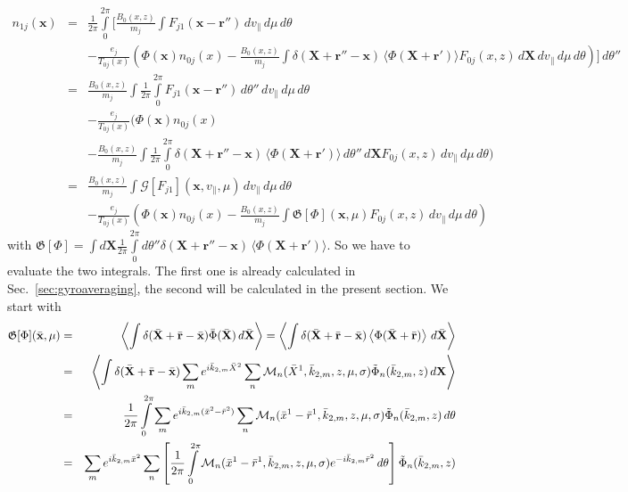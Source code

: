 \begin{eqnarray*}
  n_{1j}(\mathbf{x}) &=&\frac{1}{2\pi}\int\limits_0^{2\pi}
  \Bigg[
    \frac{B_0(x,z)}{m_j}\int F_{j1}(\mathbf{x}-\mathbf{r}'')\,dv_\|\,d\mu\,d\theta\\
    &&-\frac{e_j}{T_{0j}(x)}\left(
      \Phi(\mathbf{x}) n_{0j}(x)
      -\frac{B_0(x,z)}{m_j}\int\delta(\mathbf{X}+\mathbf{r}''-\mathbf{x})\,\langle\Phi(\mathbf{X}+\mathbf{r}')\rangle
      F_{0j}(x,z)\,d\mathbf{X}\,dv_\|\,d\mu\,d\theta
    \right) 
  \Bigg]\,d\theta''\\
  &=& 
  \frac{B_0(x,z)}{m_j}\int \frac{1}{2\pi}\int\limits_0^{2\pi} F_{j1}(\mathbf{x}-\mathbf{r}'')\,d\theta''\,dv_\|\,d\mu\,d\theta\\
  &&-\frac{e_j}{T_{0j}(x)}\Bigg(
    \Phi(\mathbf{x}) n_{0j}(x)\\
    &&-\frac{B_0(x,z)}{m_j}\int 
    \frac{1}{2\pi}\int\limits_0^{2\pi}\delta(\mathbf{X}+\mathbf{r}''-\mathbf{x})\,\langle\Phi(\mathbf{X}+\mathbf{r}')\rangle
    \,d\theta''\,d\mathbf{X} F_{0j}(x,z)\,dv_\|\,d\mu\,d\theta
  \Bigg)\\
  &=& \frac{B_0(x,z)}{m_j}\int \mathcal{G}[F_{j1}](\mathbf{x},v_\|,\mu)\,dv_\|\,d\mu\,d\theta\\
  &&-\frac{e_j}{T_{0j}(x)}\left(
    \Phi(\mathbf{x}) n_{0j}(x)
    -\frac{B_0(x,z)}{m_j}\int \mathfrak{G}[\Phi](\mathbf{x},\mu) F_{0j}(x,z)\,dv_\|\,d\mu\,d\theta
  \right) 
\end{eqnarray*}
with $\mathfrak{G}[\Phi]=\int
d\mathbf{X}\frac{1}{2\pi}\int\limits_0^{2\pi}d\theta''
\delta(\mathbf{X}+\mathbf{r}''-\mathbf{x})\,\langle\Phi(\mathbf{X}+\mathbf{r}')\rangle$. 
So we have to evaluate the two integrals. The first one is already
calculated in Sec.~\ref{sec:gyroaveraging}, the second will be
calculated in the present section. We start with 
\begin{eqnarray*}
  \mathfrak{G}[\Phi](\bar{\mathbf{x}},\mu) &=&
  \left\langle \int\delta(\bar{\mathbf{X}}+\bar{\mathbf{r}}-\bar{\mathbf{x}})\bar{\Phi}(\bar{\mathbf{X}})\,d\bar{\mathbf{X}} \right\rangle
  =\left\langle \int\delta(\bar{\mathbf{X}}+\bar{\mathbf{r}}-\bar{\mathbf{x}})
    \left\langle \Phi(\bar{\mathbf{X}}+\bar{\mathbf{r}}) \right\rangle\,d\bar{\mathbf{X}} \right\rangle \\
  &=&\left\langle \int\delta(\bar{\mathbf{X}}+\bar{\mathbf{r}}-\bar{\mathbf{x}})
    \sum_m e^{i\bar{k}_{2,m}\bar{X}^2}\sum_n\mathcal{M}_n(\bar{X}^1,\bar{k}_{2,m},z,\mu,\sigma)\tilde{\Phi}_n(\bar{k}_{2,m},z)\,d\mathbf{X} \right\rangle \\
  &=&\frac{1}{2\pi}\int\limits_0^{2\pi}
  \sum_m e^{i\bar{k}_{2,m}(\bar{x}^2-\bar{r}^2)}
  \sum_n\mathcal{M}_n(\bar{x}^1-\bar{r}^1,\bar{k}_{2,m},z,\mu,\sigma)\tilde{\Phi}_n(\bar{k}_{2,m},z)\,d\theta \\
  &=&\sum_m e^{i\bar{k}_{2,m}\bar{x}^2} \sum_n \left[
    \frac{1}{2\pi}\int\limits_0^{2\pi}
    \mathcal{M}_n(\bar{x}^1-\bar{r}^1,\bar{k}_{2,m},z,\mu,\sigma)
    e^{-i\bar{k}_{2,m}\bar{r}^2}\,d\theta
  \right]\tilde{\Phi}_n(\bar{k}_{2,m},z)
\end{eqnarray*}
